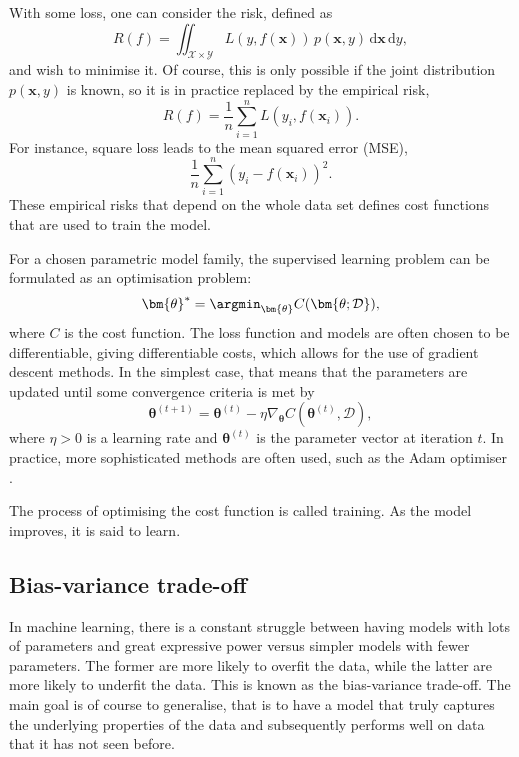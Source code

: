 With some loss, one can consider the risk, defined as
\begin{equation}
    R(f) = \iint_{\mathcal{X}\times\mathcal{Y}} L(y, f(\bm{x})) \, p(\bm{x}, y) \, \mathrm{d}\bm{x} \, \mathrm{d}y,
    \label{eq:risk}
\end{equation}
and wish to minimise it.
Of course, this is only possible if the joint distribution $p(\bm{x}, y)$ is known, so it is in practice replaced by the empirical risk,
\begin{equation}
    R(f) = \frac{1}{n} \sum_{i=1}^n L(y_i, f(\bm{x}_i)).
    \label{eq:empirical_risk}
\end{equation}
For instance, square loss leads to the mean squared error (MSE),
\begin{equation}
    \frac{1}{n} \sum_{i=1}^n (y_i - f(\bm{x}_i))^2.
\end{equation}
These empirical risks that depend on the whole data set defines cost functions that are used to train the model.

For a chosen parametric model family, the supervised learning problem can be formulated as an optimisation problem:
\begin{equation}
    \bm{\theta}^* = \argmin_{\bm{\theta}} C(\bm{\theta; \mathcal{D}}),
\end{equation}
where $C$ is the cost function.
The loss function and models are often chosen to be differentiable, giving differentiable costs, which allows for the use of gradient descent methods.
In the simplest case, that means that the parameters are updated until some convergence criteria is met by
\begin{equation}
    \bm{\theta}^{(t+1)} = \bm{\theta}^{(t)} - \eta \nabla_{\bm{\theta}} C(\bm{\theta}^{(t)}, \mathcal{D}),
\end{equation}
where $\eta>0$ is a learning rate and $\bm{\theta}^{(t)}$ is the parameter vector at iteration $t$.
In practice, more sophisticated methods are often used, such as the Adam optimiser \cite{adamoptimiser}.

The process of optimising the cost function is called training.
As the model improves, it is said to learn.

\subsection{Bias-variance trade-off}
In machine learning, there is a constant struggle between having models with lots of parameters and great expressive power versus simpler models with fewer parameters.
The former are more likely to overfit the data, while the latter are more likely to underfit the data.
This is known as the bias-variance trade-off.
The main goal is of course to generalise, that is to have a model that truly captures the underlying properties of the data and subsequently performs well on data that it has not seen before.

